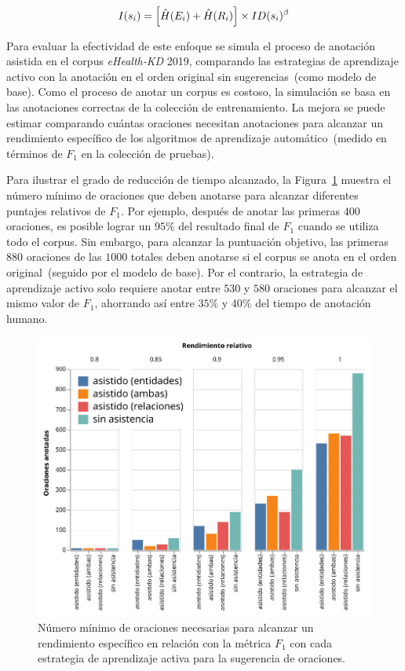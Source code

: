 \small
$$
I(s_i) = \left[ \hat{H}(E_i) + \hat{H}(R_i) \right] \times ID(s_i)^{\beta}
$$
\normalsize

Para evaluar la efectividad de este enfoque se simula el proceso de anotación asistida en el corpus \textit{eHealth-KD} 2019, comparando las estrategias de aprendizaje activo con la anotación en el orden original sin sugerencias~(como modelo de base).
Como el proceso de anotar un corpus es costoso, la simulación se basa en las anotaciones correctas de la colección de entrenamiento.
La mejora se puede estimar comparando cuántas oraciones necesitan anotaciones para alcanzar un rendimiento específico de los algoritmos de aprendizaje automático~(medido en términos de $F_1$ en la colección de pruebas).

Para ilustrar el grado de reducción de tiempo alcanzado, la Figura~\ref{fig:graph2} muestra el número mínimo de oraciones que deben anotarse para alcanzar diferentes puntajes relativos de $F_1$.
Por ejemplo, después de anotar las primeras $400$ oraciones, es posible lograr un $95\%$ del resultado final de $F_1$ cuando se utiliza todo el corpus.
Sin embargo, para alcanzar la puntuación objetivo, las primeras $880$ oraciones de las $1000$ totales deben anotarse si el corpus se anota en el orden original~(seguido por el modelo de base).
Por el contrario, la estrategia de aprendizaje activo solo requiere anotar entre $530$ y $580$ oraciones para alcanzar el mismo valor de $F_1$, ahorrando así entre $35\%$ y $40\% $ del tiempo de anotación humano.

\begin{figure}[tb]
    \centering
    \includegraphics[width=0.8\columnwidth]{Images/Chapters/CostReductionAssistedAnnotation.pdf}
    \caption[Evaluación de la estrategia de aprendizaje activo]{Número mínimo de oraciones necesarias para alcanzar un rendimiento específico en relación con la métrica $F_1$ con cada estrategia de aprendizaje activa para la sugerencia de oraciones.}
    \label{fig:graph2}
\end{figure}


